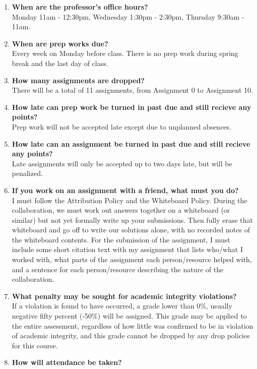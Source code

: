 \documentclass[10pt]{article}
\begin{document}
\begin{enumerate}
      \item \textbf{When are the professor's office hours?}
            \\ Monday 11am - 12:30pm, Wednesday 1:30pm - 2:30pm, Thursday 9:30am - 11am.
      \item \textbf{When are prep works due?}
            \\ Every week on Monday before class. There is no prep work during spring break and the last day of class.
      \item \textbf{How many assignments are dropped?}
            \\There will be a total of 11 assignments, from Assignment 0 to Assignment 10.
      \item \textbf{How late can prep work be turned in past due and still recieve any points?}
            \\Prep work will not be accepted late except due to unplanned absences.
      \item \textbf{How late can an assignment be turned in past due and still recieve any points?}
            \\Late assignments will only be accepted up to two days late, but will be penalized.
      \item \textbf{If you work on an assignment with a friend, what must you do?}
            \\ I must follow the Attribution Policy and the Whiteboard Policy. During the collaboration, we must work out answers together on a whiteboard (or similar) but not yet formally write up your submissions. Then fully erase that whiteboard and go off to write our solutions alone, with no recorded notes of the whiteboard contents. For the submission of the assignment, I must include some short citation text with my assignment that lists who/what I worked with, what parts of the assignment each person/resource helped with, and a sentence for each person/resource describing the nature of the collaboration.
      \item \textbf{What penalty may be sought for academic integrity violations?}
            \\If a violation is found to have occurred, a grade lower than 0\%, usually negative fifty percent (-50\%) will be assigned. This grade may be applied to the entire assessment, regardless of how little was confirmed to be in violation of academic integrity, and this grade cannot be dropped by any drop policies for this course.
      \item \textbf{How will attendance be taken?}

\end{enumerate}
\end{document}
